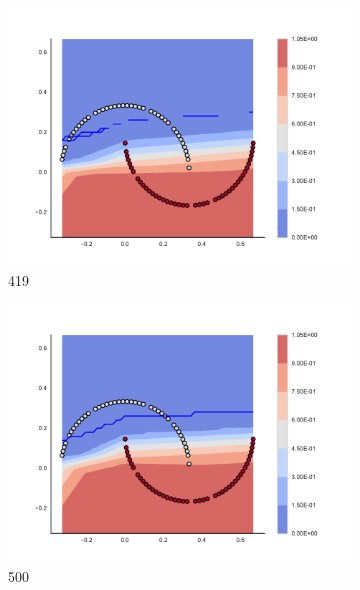\begin{figure}[h]
\begin{subfigure}[b]{0.09\textwidth}
    \includegraphics[clip, trim=2.35cm 1.75cm 4.5cm 0cm,width=\textwidth]{img/convergence/419.pdf}
    \caption{419}
    \label{fig:convergence_419}
\end{subfigure}
%
\begin{subfigure}[b]{0.09\textwidth}
    \includegraphics[clip, trim=2.35cm 1.75cm 4.5cm 0cm,width=\textwidth]{img/convergence/500.pdf}
    \caption{500}
    \label{fig:convergence_500}
\end{subfigure}
%
\begin{subfigure}[b]{0.09\textwidth}

\end{subfigure}
\end{figure}
